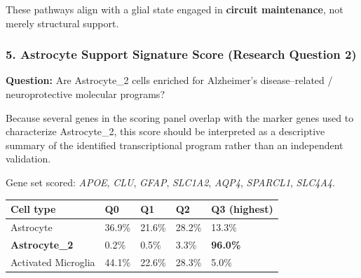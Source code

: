 \documentclass[
  11pt,
]{article}
\newcounter{none} %
\begin{document}
These pathways align with a glial state engaged in \textbf{circuit
maintenance}, not merely structural support.

\subsubsection{5. Astrocyte Support Signature Score (Research Question
2)}\label{astrocyte-support-signature-score-research-question-2}

\textbf{Question:} Are Astrocyte\_2 cells enriched for Alzheimer's
disease--related / neuroprotective molecular programs?

Because several genes in the scoring panel overlap with the marker genes
used to characterize Astrocyte\_2, this score should be interpreted as a
descriptive summary of the identified transcriptional program rather
than an independent validation.

Gene set scored: \emph{APOE}, \emph{CLU}, \emph{GFAP}, \emph{SLC1A2},
\emph{AQP4}, \emph{SPARCL1}, \emph{SLC4A4}.

{\def\LTcaptype{none} %
\begin{longtable}[]{@{}lllll@{}}
\toprule\noalign{}
Cell type & Q0 & Q1 & Q2 & Q3 (highest) \\
\midrule\noalign{}
\endhead
\bottomrule\noalign{}
\endlastfoot
Astrocyte & 36.9\% & 21.6\% & 28.2\% & 13.3\% \\
\textbf{Astrocyte\_2} & 0.2\% & 0.5\% & 3.3\% & \textbf{96.0\%} \\
Activated Microglia & 44.1\% & 22.6\% & 28.3\% & 5.0\% \\
\end{longtable}
}
\end{document}
